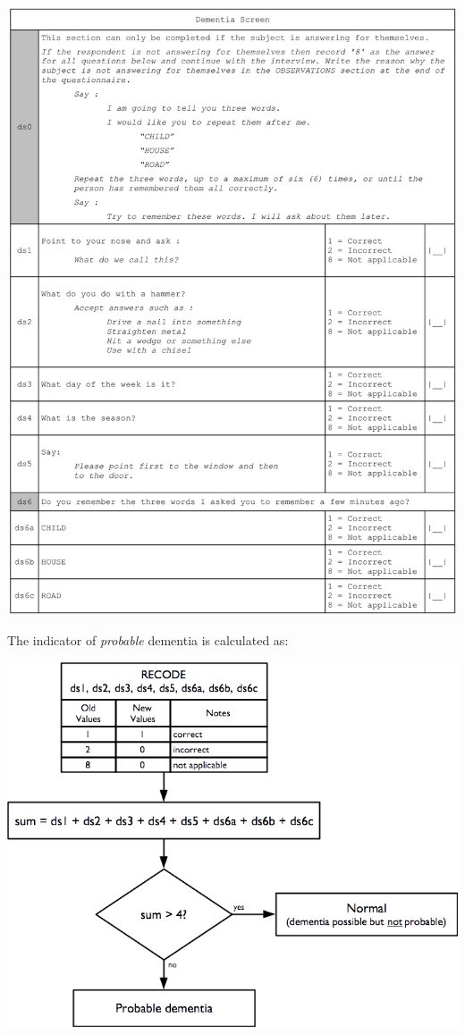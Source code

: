\documentclass[12pt,a4paper]{book}
\theoremstyle{definition}
\theoremstyle{definition}
\theoremstyle{definition}
\theoremstyle{remark}
\begin{document}
\begin{center}\includegraphics{figures/questionnaire07} \end{center}

\newpage

The indicator of \emph{probable} dementia is calculated as:

\begin{center}\includegraphics{figures/indicators20} \end{center}
\end{document}
